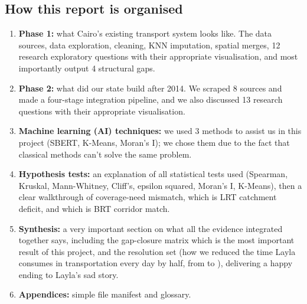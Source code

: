 \subsection{How this report is organised}

\begin{enumerate}
  \item \textbf{Phase 1:} what Cairo's existing transport system looks
        like. The data sources, data exploration, cleaning, KNN
        imputation, spatial merges, 12 research exploratory questions
        with their appropriate visualisation, and most importantly
        output 4 structural gaps.
  \item \textbf{Phase 2:} what did our state build after 2014. We
        scraped 8 sources and made a four-stage integration pipeline,
        and we also discussed 13 research questions with their
        appropriate visualisation.
  \item \textbf{Machine learning (AI) techniques:} we used 3 methods
        to assist us in this project (SBERT, K-Means, Moran's I); we
        chose them due to the fact that classical methods can't solve
        the same problem.
  \item \textbf{Hypothesis tests:} an explanation of all statistical
        tests used (Spearman, Kruskal, Mann-Whitney, Cliff's, epsilon
        squared, Moran's I, K-Means), then a clear walkthrough of
         coverage-need mismatch,  which is LRT
        catchment deficit, and  which is BRT corridor match.
  \item \textbf{Synthesis:} a very important section on what all the
        evidence integrated together says, including the gap-closure
        matrix which is the most important result of this project,
        and the resolution set (how we reduced the time Layla
        consumes in transportation every day by half, from
         to ), delivering a happy
        ending to Layla's sad story.
  \item \textbf{Appendices:} simple file manifest and glossary.
\end{enumerate}
